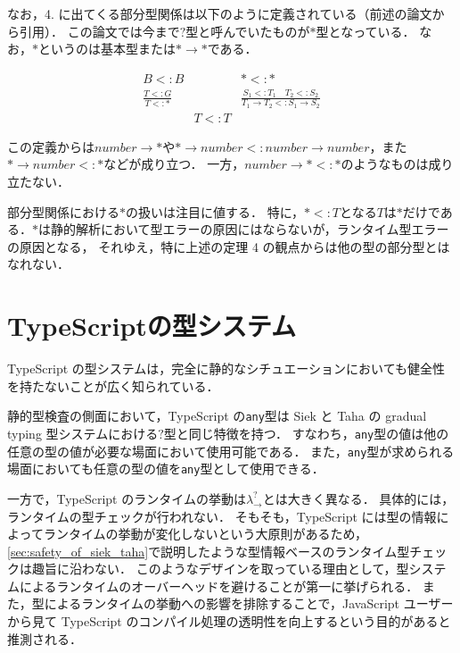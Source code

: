 なお，4. に出てくる部分型関係は以下のように定義されている（前述の論文\cite{siek_et_al:LIPIcs.SNAPL.2015.274}から引用）．
この論文では今まで$?$型と呼んでいたものが$*$型となっている．
なお，$*$というのは基本型または$* \to *$である．

\[
    \begin{array}{ccc}
        B <: B                & \quad          & * <: *                                                         \\[1em]
        \frac{T <: G}{T <: *} & \quad          & \frac{S_1 <: T_1 \quad T_2 <: S_2}{T_1 \to T_2 <: S_1 \to S_2} \\[2em]
                              & \boxed{T <: T} &
    \end{array}
\]

この定義からは$number \to *$や$* \to number <: number \to number$，また$* \to number <: *$などが成り立つ．
一方，$number \to * <: *$のようなものは成り立たない．

部分型関係における$*$の扱いは注目に値する．
特に，$* <: T$となる$T$は$*$だけである．$*$は静的解析において型エラーの原因にはならないが，ランタイム型エラーの原因となる，
それゆえ，特に上述の定理 4 の観点からは他の型の部分型とはなれない．

\section{TypeScriptの型システム}

TypeScript の型システムは，完全に静的なシチュエーションにおいても健全性を持たないことが広く知られている．

静的型検査の側面において，TypeScript の\texttt{any}型は Siek と Taha の gradual typing 型システムにおける$?$型と同じ特徴を持つ．
すなわち，\texttt{any}型の値は他の任意の型の値が必要な場面において使用可能である．
また，\texttt{any}型が求められる場面においても任意の型の値を\texttt{any}型として使用できる．

一方で，TypeScript のランタイムの挙動は$\lambda^?_\to$とは大きく異なる．
具体的には，ランタイムの型チェックが行われない．
そもそも，TypeScript には型の情報によってランタイムの挙動が変化しないという大原則があるため，\ref{sec:safety_of_siek_taha}で説明したような型情報ベースのランタイム型チェックは趣旨に沿わない．
このようなデザインを取っている理由として，型システムによるランタイムのオーバーヘッドを避けることが第一に挙げられる．
また，型によるランタイムの挙動への影響を排除することで，JavaScript ユーザーから見て TypeScript のコンパイル処理の透明性を向上するという目的があると推測される．

